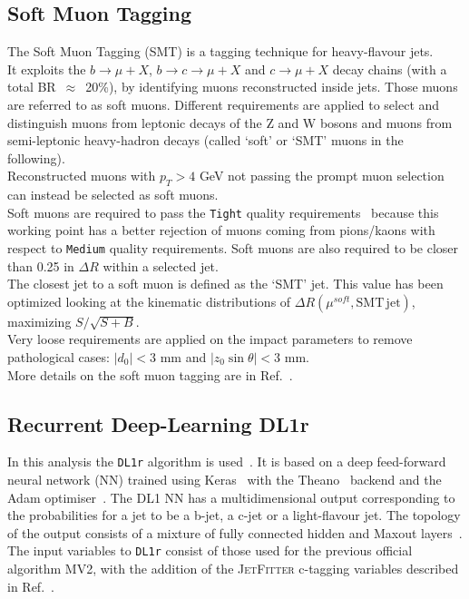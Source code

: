 \subsection{Soft Muon Tagging}
\label{sec:object:soft_muons}
\label{sec:object:smt}
The Soft Muon Tagging (SMT) is a tagging technique for heavy-flavour jets.\\
It exploits the $b \rightarrow \mu + X$,
$b \rightarrow c \rightarrow \mu + X$ and $c \rightarrow \mu + X$ decay chains (with a total BR~$\approx$~20\%), by identifying muons reconstructed inside jets. Those muons are referred to as soft muons.
Different requirements are applied to select and distinguish muons 
from leptonic decays of the Z and W bosons 
and muons from semi-leptonic heavy-hadron decays 
(called `soft' or `SMT' muons in the following). \\
Reconstructed muons with $p_{T} > 4 $ GeV not passing 
the prompt muon selection can instead be selected as soft muons.\\
Soft muons are required to pass the \texttt{Tight} quality requirements~\cite{muon2015}
because this working point has a better rejection of muons coming from pions/kaons with respect to \texttt{Medium} quality requirements.
Soft muons are also required to be closer than 0.25 in $\Delta R$ within a selected jet.\\
The closest jet to a soft muon is defined as the `SMT' jet. 
This value has been optimized looking at the kinematic distributions of $\Delta R(\mu^{soft}, \mathrm{SMT\, jet})$, maximizing $S/\sqrt{S+B}$.\\
Very loose requirements are applied on the impact parameters to remove
pathological cases: 
$|d_0| < 3$ mm and $|z_0 \sin\theta| < 3$  mm.\\
More details on the soft muon tagging are in Ref.~\cite{SMT-INT-13TeV}.

\subsection{Recurrent Deep-Learning DL1r}
In this analysis the \texttt{DL1r} algorithm is used~\cite{ATL-PHYS-PUB-2017-013,Aad:2019aic}.
It is based on a deep feed-forward neural network (NN) trained using Keras~\cite{keras} with the Theano~\cite{theano} backend and the Adam optimiser~\cite{adam}. The DL1 NN has a multidimensional output corresponding to the probabilities for a jet to be a b-jet, a c-jet or a light-flavour jet. The topology of the output consists of a mixture of fully connected hidden and Maxout layers~\cite{goodfellow2013maxout}. The input variables to \texttt{DL1r} consist of those used for the previous official algorithm MV2, with the addition of the \textsc{JetFitter} c-tagging variables described in Ref.~\cite{Aad:2019aic}.
